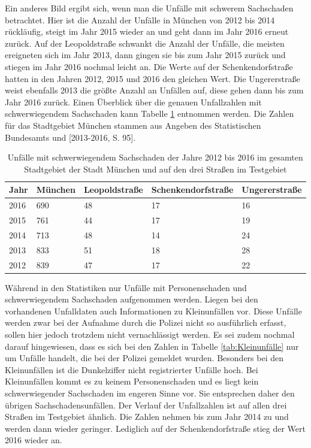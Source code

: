 Ein anderes Bild ergibt sich, wenn man die Unfälle mit schwerem Sachschaden betrachtet. Hier ist die Anzahl der Unfälle in München von 2012 bis 2014 rückläufig, steigt im Jahr 2015 wieder an und geht dann im Jahr 2016 erneut zurück. Auf der Leopoldstraße schwankt die Anzahl der Unfälle, die meisten ereigneten sich im Jahr 2013, dann gingen sie bis zum Jahr 2015 zurück und stiegen im Jahr 2016 nochmal leicht an. Die Werte auf der Schenkendorfstraße hatten in den Jahren 2012, 2015 und 2016 den gleichen Wert. Die Ungererstraße weist ebenfalls 2013 die größte Anzahl an Unfällen auf, diese gehen dann bis zum Jahr 2016 zurück. Einen Überblick über die genauen Unfallzahlen mit schwerwiegendem Sachschaden kann Tabelle \ref{tab:Unfälle München schwerw. Sachschaden} entnommen werden. Die Zahlen für das Stadtgebiet München stammen aus Angeben des Statistischen Bundesamts \parencite[S. 98]{StatistischesBundesamt.2017} und [2013-2016, S. 95].

\begin{table}[htpb]
	\scriptsize
	\caption[Unfälle mit schwerwiegendem Sachschaden]{Unfälle mit schwerwiegendem Sachschaden der Jahre 2012 bis 2016 im gesamten Stadtgebiet der Stadt München und auf den drei Straßen im Testgebiet}\label{tab:Unfälle München schwerw. Sachschaden}
	\centering
	\begin{tabular}{l l l l p{2cm}}
		\toprule
		Jahr & München & Leopoldstraße & Schenkendorfstraße & Ungererstraße \\
		\midrule
		2016 & 690 & 48 & 17 & 16\\
		2015 & 761 & 44 & 17 & 19\\
		2014 & 713 & 48 & 14 & 24\\
		2013 & 833 & 51 & 18 & 28\\
		2012 & 839 & 47 & 17 & 22\\
		\bottomrule
	\end{tabular}
\end{table}

Während in den Statistiken nur Unfälle mit Personenschaden und schwerwiegendem Sachschaden aufgenommen werden. Liegen bei den vorhandenen Unfalldaten auch Informationen zu Kleinunfällen vor. Diese Unfälle werden zwar bei der Aufnahme durch die Polizei nicht so ausführlich erfasst, sollen hier jedoch trotzdem nicht vernachlässigt werden. Es sei zudem nochmal darauf hingewiesen, dass es sich bei den Zahlen in Tabelle \ref{tab:Kleinunfälle} nur um Unfälle handelt, die bei der Polizei gemeldet wurden. Besonders bei den Kleinunfällen ist die Dunkelziffer nicht registrierter Unfälle hoch. Bei Kleinunfällen kommt es zu keinem Personenschaden und es liegt kein schwerwiegender Sachschaden im engeren Sinne vor. Sie entsprechen daher den übrigen Sachschadensunfällen. Der Verlauf der Unfallzahlen ist auf allen drei Straßen im Testgebiet ähnlich. Die Zahlen nehmen bis zum Jahr 2014 zu und werden dann wieder geringer. Lediglich auf der Schenkendorfstraße stieg der Wert 2016 wieder an.

